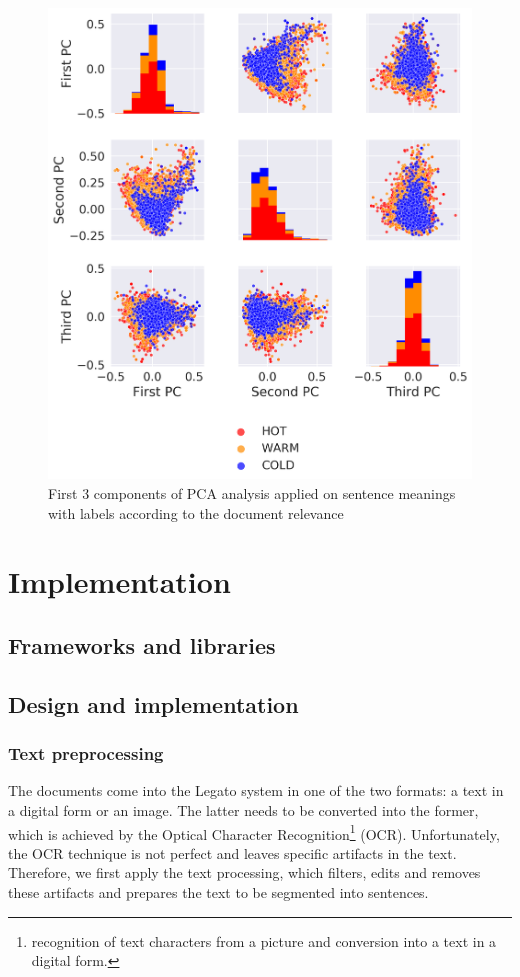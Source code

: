 \documentclass[
  digital, %
  table,   %
  lof,     %
  lot,     %
]{fithesis3}
\begin{document}
\begin{figure}[H]
\caption{First 3 components of PCA analysis applied on sentence meanings with labels according to the document relevance}
\label{fig:PCA_sent_relevance}
\includegraphics[width=\textwidth]{img/PCA_doc_relevance}
\end{figure}

\chapter{Implementation}
\section{Frameworks and libraries}
\section{Design and implementation}

\subsection{Text preprocessing}
The documents come into the Legato system in one of the two formats: a text in a digital form or an image.
The latter needs to be converted into the former, which is achieved by the Optical Character Recognition\footnote{recognition of text characters from a picture and conversion into a text in a digital form.} (OCR).
Unfortunately, the OCR technique is not perfect and leaves specific artifacts in the text.
Therefore, we first apply the text processing, which filters, edits and removes these artifacts and prepares the text to be segmented into sentences.
\end{document}
